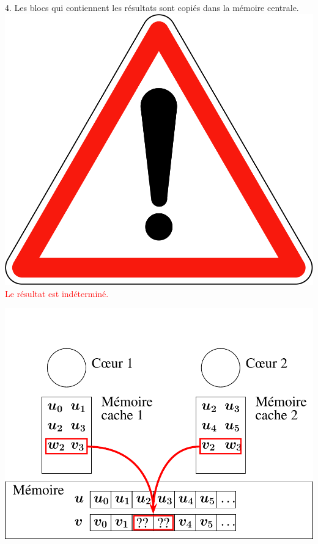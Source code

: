 \documentclass{beamer}
\begin{document}
\begin{frame}
	\parbox[t][1cm]{10cm}{4. Les blocs qui contiennent les résultats sont copiés dans la mémoire centrale. \includegraphics[scale=0.015]{../../Images/A14} \textcolor{red}{Le résultat est indéterminé.} 
	}
   \begin{center}
	\includegraphics[scale=0.6]{../../Images/multithread3}
   \end{center}
\end{frame}
\end{document}
